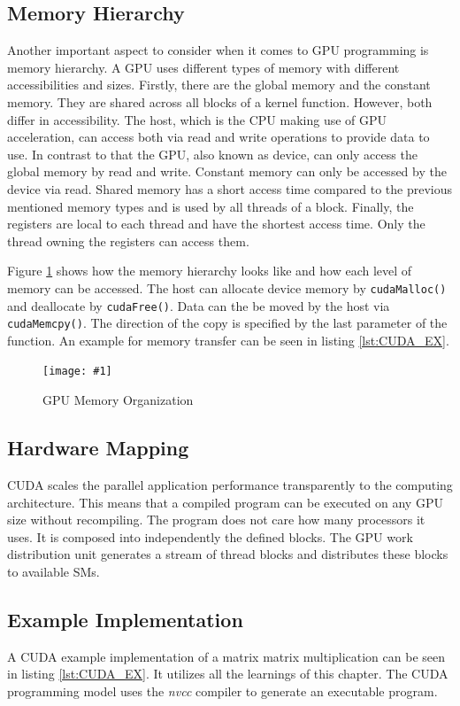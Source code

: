 \documentclass[a4paper,12pt]{llncs}
\numberwithin{equation}{section}
\newcommand{\bildbreite}[5]{
  \begin{figure}[htbp]
    \begin{center}
      \texttt{[image: \#1]}
      \caption[#5]{#4}
      \label{#3}
    \end{center}
  \end{figure}
}
\begin{document}
    
\subsection{Memory Hierarchy}
\label{subsec:MemHi}
  Another important aspect to consider when it comes to GPU programming is memory hierarchy.
  A GPU uses different types of memory with different accessibilities and sizes.
  Firstly, there are the global memory and the constant memory.
  They are shared across all blocks of a kernel function.
  However, both differ in accessibility.
  The host, which is the CPU making use of GPU acceleration, can access both via read and write operations to provide data to use.
  In contrast to that the GPU, also known as device, can only access the global memory by read and write.
  Constant memory can only be accessed by the device via read.
  Shared memory has a short access time compared to the previous mentioned memory types and is used by all threads of a block.
  Finally, the registers are local to each thread and have the shortest access time.
  Only the thread owning the registers can access them.~\cite{Rauber.2012}~\cite{Huang.2008}
     
  Figure \ref{fig:memorga} shows how the memory hierarchy looks like and how each level of memory can be accessed.
  The host can allocate device memory by \texttt{cudaMalloc()} and deallocate by \texttt{cudaFree()}.
  Data can the be moved by the host via \texttt{cudaMemcpy()}.
  The direction of the copy is specified by the last parameter of the function.
  An example for memory transfer can be seen in listing \ref{lst:CUDA_EX}.
  
  \bildbreite{figures/speicheroragnisation.jpg}{8cm}{fig:memorga}{GPU Memory Organization~\cite{Rauber.2012}}{}
  
      
\subsection{Hardware Mapping}
  CUDA scales the parallel application performance transparently to the computing architecture.
  This means that a compiled program can be executed on any GPU size without recompiling.
  The program does not care how many processors it uses.
  It is composed into independently the defined blocks.
  The GPU work distribution unit generates a stream of thread blocks and distributes these blocks to available SMs.~\cite{Lindholm.2008}~\cite{NVIDIA.2019}
  
\subsection{Example Implementation}
  A CUDA example implementation of a matrix matrix multiplication can be seen in listing \ref{lst:CUDA_EX}.
  It utilizes all the learnings of this chapter.
  The CUDA programming model uses the \textit{nvcc} compiler to generate an executable program.
\end{document}
